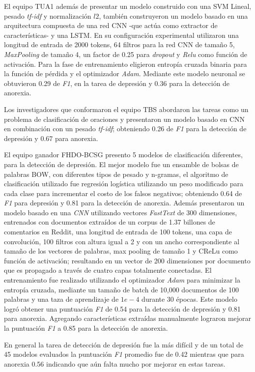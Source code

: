 El equipo TUA1 \citep{liu2018tua1} además de presentar un modelo construido con una SVM Lineal, pesado \textit{tf-idf} y normalización $l2$, también construyeron un modelo basado en una arquitectura compuesta de una red CNN -que actúa como extractor de características- y una LSTM. En su configuración experimental utilizaron una longitud de entrada de 2000 tokens, 64 filtros para la red CNN de tamaño 5, \textit{MaxPooling} de tamaño 4, un factor de 0.25 para \textit{dropout} y \textit{Relu} como función de activación. Para la fase de entrenamiento eligieron entropía cruzada binaria para la función de pérdida y el optimizador \textit{Adam}. Mediante este modelo neuronal se obtuvieron 0.29 de \textit{F1}, en la tarea de depresión y 0.36 para la detección de anorexia. 

Los investigadores que conformaron el equipo TBS \citep{wang2018neural} abordaron las tareas como un problema de clasificación de oraciones y presentaron un modelo basado en CNN en combinación con un pesado \textit{tf-idf}; obteniendo 0.26 de \textit{F1} para la detección de depresión y 0.67 para anorexia.

El equipo ganador \citep{trotzek2018word} FHDO-BCSG presento 5 modelos de clasificación diferentes, para la detección de depresión. El mejor modelo fue un ensamble de bolsas de palabras BOW, con diferentes tipos de pesado y n-gramas, el algoritmo de clasificación utilizado fue regresión logística utilizando un peso modificado para cada clase para incrementar el costo de los falsos negativos; obteniendo 0.64 de \textit{F1} para depresión y 0.81 para la detección de anorexia. 
Además presentaron un modelo basado en una \textit{CNN} utilizando vectores \textit{FastText} de 300 dimensiones, entrenados con documentos extraídos de un corpus de 1.37 billones de comentarios en Reddit, una longitud de entrada de 100 tokens, una capa de convolución, 100 filtros con altura igual a 2 y con un ancho correspondiente al tamaño de los vectores de palabras, max pooling de tamaño 1 y CReLu como función de activación; resultando en un vector de 200 dimensiones por documento que es propagado a través de cuatro capas totalmente conectadas. El entrenamiento fue realizado utilizando el optimizador \textit{Adam} para minimizar la entropía cruzada, mediante un tamaño de batch de 10,000 documentos de 100 palabras  y una taza de aprendizaje de $1e-4$ durante 30 épocas. Este modelo logró obtener una puntuación \textit{F1} de 0.54 para la detección de depresión y 0.81 para anorexia. Agregando características extraídas manualmente lograron mejorar la puntuación \textit{F1} a 0.85 para la detección de anorexia.

En general la tarea de detección de depresión fue la más difícil y de un total de 45 modelos evaluados la puntuación \textit{F1} promedio fue de 0.42 mientras que para anorexia 0.56 indicando que aún falta mucho por mejorar en estas tareas. 